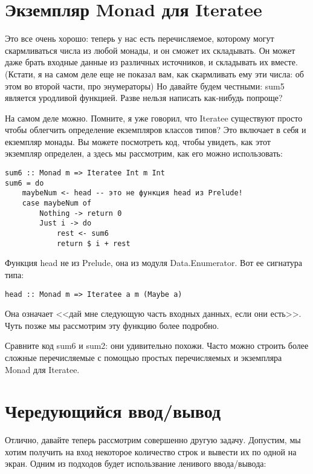 \section{Экземпляр Monad для Iteratee}

Это все очень хорошо: теперь у нас есть перечисляемое, которому могут скармливаться числа из любой монады, и он сможет их складывать. Он может даже брать входные данные из различных источников, и складывать их вместе. (Кстати, я на самом деле еще не показал вам, как скармливать ему эти числа: об этом во второй части, про энумераторы) Но давайте будем честными: sum5 является уродливой функцией. Разве нельзя написать как-нибудь попроще?

На самом деле можно. Помните, я уже говорил, что Iteratee существуют просто чтобы облегчить определение екземпляров классов типов? Это включает в себя и екземпляр монады. Вы можете посмотреть код, чтобы увидеть, как этот экземпляр определен, а здесь мы рассмотрим, как его можно использовать:

\begin{lstlisting}
sum6 :: Monad m => Iteratee Int m Int
sum6 = do
    maybeNum <- head -- это не функция head из Prelude!
    case maybeNum of
        Nothing -> return 0
        Just i -> do
            rest <- sum6
            return $ i + rest
\end{lstlisting}%

Функция head не из Prelude, она из модуля Data.Enumerator. Вот ее сигнатура типа:

\begin{lstlisting}
head :: Monad m => Iteratee a m (Maybe a)
\end{lstlisting}

Она означает <<дай мне следующую часть входных данных, если они есть>>. Чуть позже мы рассмотрим эту функцию более подробно.

Сравните код sum6 и sum2: они удивительно похожи. Часто можно строить более сложные перечисляемые с помощью простых перечисляемых и экземпляра Monad для Iteratee.

\section{Чередующийся ввод/вывод}

Отлично, давайте теперь рассмотрим совершенно другую задачу. Допустим, мы хотим получить на вход некоторое количество строк и вывести их по одной на экран. Одним из подходов будет использвание ленивого ввода/вывода:

